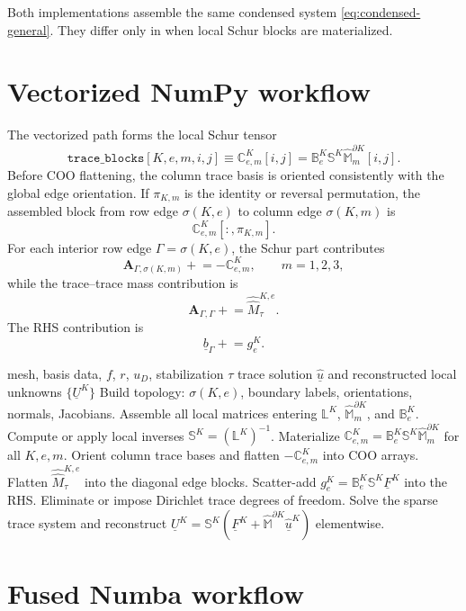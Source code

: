 \documentclass[11pt]{article}
\newcommand{\uhat}{\underline{\widehat u}}
\newcommand{\UK}{\underline U^K}
\newcommand{\FK}{\underline F^K}
\newcommand{\LK}{\mathbb L^K}
\newcommand{\SK}{\mathbb S^K}
\newcommand{\B}{\mathbb B}
\newcommand{\C}{\mathbb C}
\newcommand{\Mbb}{\widehat{\mathbb M}}
\newcommand{\Mhh}{\widehat{\widehat M}}
\newcommand{\code}[1]{\texttt{#1}}
\begin{document}
Both implementations assemble the same condensed system \eqref{eq:condensed-general}. They differ only in when local Schur blocks are materialized.

\section{Vectorized NumPy workflow}

The vectorized path forms the local Schur tensor
\begin{equation}\label{eq:trace-block-tensor}
    \code{trace\_blocks}[K,e,m,i,j]
    \equiv
    \C_{e,m}^K[i,j]
    =
    \B_e^K\SK\Mbb_m^{\partial K}[i,j].
\end{equation}
Before COO flattening, the column trace basis is oriented consistently with the global edge orientation. If $\pi_{K,m}$ is the identity or reversal permutation, the assembled block from row edge $\sigma(K,e)$ to column edge $\sigma(K,m)$ is
\[
    \C_{e,m}^K[:,\pi_{K,m}].
\]
For each interior row edge $\Gamma=\sigma(K,e)$, the Schur part contributes
\[
    \mathbf A_{\Gamma,\sigma(K,m)} \mathrel{+}= -\C_{e,m}^K,
    \qquad m=1,2,3,
\]
while the trace--trace mass contribution is
\[
    \mathbf A_{\Gamma,\Gamma}\mathrel{+}=\Mhh_\tau^{K,e}.
\]
The RHS contribution is
\[
    \underline b_\Gamma\mathrel{+}=g_e^K.
\]

\begin{algorithm}[p]
\caption{Vectorized NumPy HDG assembly}
\footnotesize
\begin{algorithmic}[1]
\Require mesh, basis data, $f$, $r$, $u_D$, stabilization $\tau$
\Ensure trace solution $\uhat$ and reconstructed local unknowns $\{\UK\}$
\State Build topology: $\sigma(K,e)$, boundary labels, orientations, normals, Jacobians.
\State Assemble all local matrices entering $\LK$, $\Mbb_m^{\partial K}$, and $\B_e^K$.
\State Compute or apply local inverses $\SK=(\LK)^{-1}$.
\State Materialize $\C_{e,m}^K=\B_e^K\SK\Mbb_m^{\partial K}$ for all $K,e,m$.
\State Orient column trace bases and flatten $-\C_{e,m}^K$ into COO arrays.
\State Flatten $\Mhh_\tau^{K,e}$ into the diagonal edge blocks.
\State Scatter-add $g_e^K=\B_e^K\SK\FK$ into the RHS.
\State Eliminate or impose Dirichlet trace degrees of freedom.
\State Solve the sparse trace system and reconstruct $\UK=\SK(\FK+\Mbb^{\partial K}\uhat^K)$ elementwise.
\end{algorithmic}
\end{algorithm}

\section{Fused Numba workflow}
\end{document}
